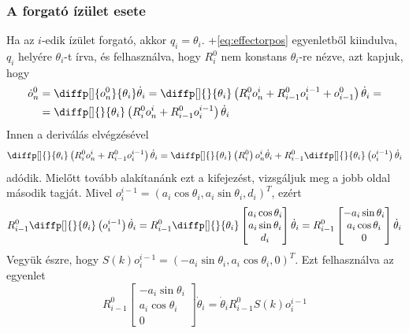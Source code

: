 \documentclass[12pt,a4paper]{report}
\theoremstyle{remark}
\theoremstyle{definition}
\begin{document}
\subsubsection{A forgató ízület esete}
Ha az $i$-edik ízület forgató, akkor $q_i = \theta_i$. \Az+\eqref{eq:effectorpos} egyenletből kiindulva, $q_i$ 
helyére $\theta_i$-t írva, és felhasználva, hogy $R^{0}_{i}$ nem konstans $\theta_i$-re nézve, azt kapjuk, hogy
\begin{equation}
\begin{aligned}
\dot{o}^{0}_{n} &= \diffp[]{o^{0}_{n}}{\theta_i} \dot{\theta}_i =
    \diffp[]{}{\theta_i} \left( R^{0}_{i}o^{i}_{n} + R^{0}_{i-1}o^{i-1}_{i} + o^{0}_{i-1} \right) \dot{\theta}_i =\\
&= \diffp[]{}{\theta_i} \left( R^{0}_{i}o^{i}_{n} + R^{0}_{i-1}o^{i-1}_{i} \right) \dot{\theta}_i
\end{aligned}
\end{equation}
Innen a deriválás elvégzésével
\begin{equation}
\diffp[]{}{\theta_i} \left( R^{0}_{i}o^{i}_{n} + R^{0}_{i-1}o^{i-1}_{i} \right) \dot{\theta}_i = 
    \diffp[]{}{\theta_i} \left( R^{0}_{i} \right) o^{i}_{n} \dot{\theta}_i + 
        R^{0}_{i-1} \diffp[]{}{\theta_i} \left( o^{i-1}_{i} \right) \dot{\theta}_i
\end{equation}
adódik. Mielőtt tovább alakítanánk ezt a kifejezést, vizsgáljuk meg a jobb oldal második tagját. Mivel 
$o^{i-1}_{i} = (a_i \cos \theta_i, a_i \sin \theta_i, d_i)^T$, ezért
\begin{equation}
R^{0}_{i-1} \diffp[]{}{\theta_i} \left( o^{i-1}_{i} \right) \dot{\theta}_i =
    R^{0}_{i-1} \diffp[]{}{\theta_i} 
    \begin{bmatrix}
    a_i \cos \theta_i \\ 
    a_i \sin \theta_i \\ 
    d_i
    \end{bmatrix} \dot{\theta}_i = 
        R^{0}_{i-1}
        \begin{bmatrix}
        -a_i \sin \theta_i \\ 
        a_i \cos \theta_i \\ 
        0
        \end{bmatrix} \dot{\theta}_i
\end{equation}
Vegyük észre, hogy $S(k) o^{i-1}_{i} = (-a_i \sin \theta_i, a_i \cos \theta_i, 0)^T$. Ezt felhasználva az egyenlet
\begin{equation}
R^{0}_{i-1}
\begin{bmatrix}
-a_i \sin \theta_i \\ 
a_i \cos \theta_i \\ 
0
\end{bmatrix} \dot{\theta}_i =
    \dot{\theta}_i R^{0}_{i-1} S(k) o^{i-1}_{i}
\end{equation}
\end{document}
